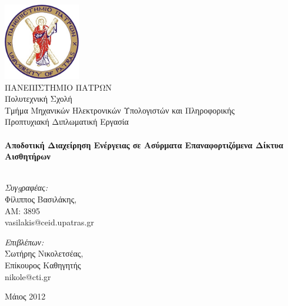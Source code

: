 
\begin{titlingpage}
\begin{center}

\includegraphics[width=0.25\textwidth]{upatras_logo.jpg}\\[1cm]

\HUGE 	ΠΑΝΕΠΙΣΤΗΜΙΟ ΠΑΤΡΩΝ\\
\LARGE	Πολυτεχνική Σχολή\\
\Huge	Τμήμα Μηχανικών Ηλεκτρονικών Υπολογιστών και Πληροφορικής\\[1.5cm]

\LARGE Προπτυχιακή Διπλωματική Εργασία\\[0.1cm]


\HRule \\[0.4cm]
{ \HUGE \bfseries Αποδοτική Διαχείρηση Ενέργειας σε Ασύρματα Επαναφορτιζόμενα Δίκτυα Αισθητήρων}\\[0.4cm]

\HRule \\[0.5cm]

\begin{minipage}{0.4\textwidth}
\begin{flushleft} \large
\emph{Συγgραφέας:}\\
Φίλιππος Βασιλάκης, \\AM: 3895\\ vasilakis@ceid.upatras.gr
\end{flushleft}
\end{minipage}
\begin{minipage}{0.4\textwidth}
\begin{flushright} \large
\emph{Επιβλέπων:} \\
Σωτήρης Νικολετσέας, \\Επίκουρος Καθηγητής\\ nikole@cti.gr
\end{flushright}
\end{minipage}

\vfill

{\large Μάιος 2012}

\end{center}

\end{titlingpage}

